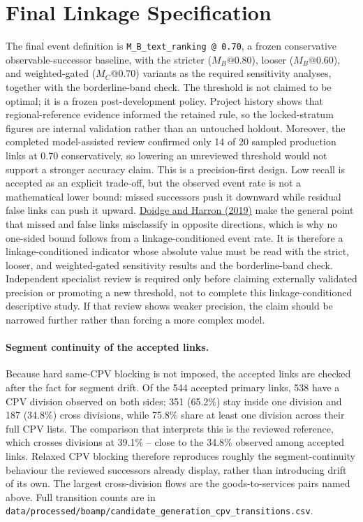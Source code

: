 \documentclass[11pt,a4paper]{article}
\newcommand{\code}[1]{\texttt{#1}}
\begin{document}
\section{Final Linkage Specification}
The final event definition is \code{M\_B\_text\_ranking @ 0.70}, a frozen
conservative observable-successor baseline, with the stricter
(\(M_B@0.80\)), looser (\(M_B@0.60\)), and weighted-gated (\(M_C@0.70\)) variants
as the required sensitivity analyses, together with the borderline-band check.
The threshold is not claimed to be optimal; it is a frozen post-development
policy. Project history shows that regional-reference evidence informed the
retained rule, so the locked-stratum figures are internal validation rather than
an untouched holdout. Moreover, the completed
model-assisted review confirmed only 14 of 20 sampled production links at
$0.70$ conservatively, so lowering an unreviewed threshold would not support a
stronger accuracy claim. This is a precision-first design. Low recall is
accepted as an explicit trade-off, but the
observed event rate is not a mathematical lower bound: missed successors push it
downward while residual false links can push it upward.
\href{https://doi.org/10.1093/ije/dyz203}{Doidge and Harron (2019)} make the
general point that missed and false links misclassify in opposite directions, which
is why no one-sided bound follows from a linkage-conditioned event rate. It is therefore a
linkage-conditioned indicator whose absolute value must be read with the strict,
looser, and weighted-gated sensitivity results and the borderline-band check.
Independent specialist review is required only before claiming externally
validated precision or promoting a new threshold, not to complete this
linkage-conditioned descriptive study.
If that review shows weaker precision, the claim should be narrowed further
rather than forcing a more complex model.

\paragraph{Segment continuity of the accepted links.}
Because hard same-CPV blocking is not imposed, the accepted links are checked
after the fact for segment drift. Of the 544
accepted primary links,
538 have a CPV
division observed on both sides;
351
(65.2\%) stay inside one division and
187
(34.8\%) cross divisions, while
75.8\% share at least one division
across their full CPV lists. The comparison that interprets this is the reviewed
reference, which crosses divisions at
39.1\% -- close to the
34.8\% observed among accepted links. Relaxed
CPV blocking therefore reproduces roughly the segment-continuity behaviour the
reviewed successors already display, rather than introducing drift of its own.
The largest cross-division flows are the goods-to-services pairs named above.
Full transition counts are in
\code{data/processed/boamp/candidate\_generation\_cpv\_transitions.csv}.
\end{document}
